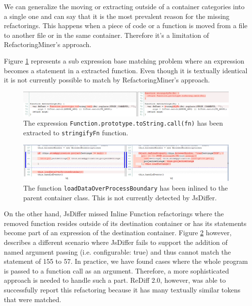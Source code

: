 \documentclass[letterpaper,12pt,onecolumn,final]{report}
\begin{document}
We can generalize the moving or extracting outside of a container categories into a single one and can say  that it is the most prevalent reason for the missing refactorings. This happens when a piece of code or a function is moved from a file to another file or in the same container. Therefore it's a limitation of RefactoringMiner's approach.

Figure \ref{fig:extractStringify} represents a sub expression base matching problem where an expression becomes a statement in a extracted function. Even though it is textually identical it is not currently possible to match by RefactoringMiner's approach.

\begin{figure}
\includegraphics[width=\textwidth,height=\textheight,keepaspectratio]{images/stringify.PNG}
  \caption{The expression \texttt{Function.prototype.toString.call(fn)} has been extracted to \texttt{stringifyFn} function.}
   \label{fig:extractStringify}
\end{figure} 

\begin{figure}
\includegraphics[width=\textwidth,keepaspectratio]{images/MissingInline.PNG}
  \caption{The function \texttt{loadDataOverProcessBoundary} has been inlined to the parent container class. This is not currently detected by JsDiffer.}
   \label{fig:inlineFunction}
\end{figure} 

On the other hand, JsDiffer missed Inline Function refactorings where the removed function resides outside of its destination container or has its statements become part of an expression of the destination container. Figure \ref{fig:inlineFunction} however, describes a different scenario where JsDiffer fails to support the addition of named argument passing (i.e. configurable: true) and thus cannot match the statement of 155 to 57. In practice, we have found cases where the whole program is passed to a function call as an argument. Therefore, a more sophisticated approach is needed to handle such a part. ReDiff 2.0, however, was able to successfully report this refactoring because it has many textually similar tokens that were matched.
\end{document}
